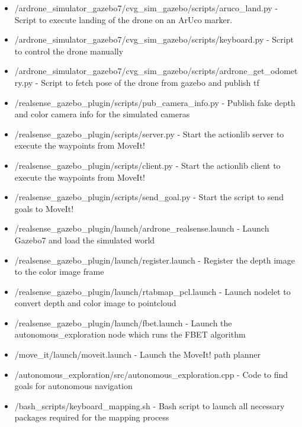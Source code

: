 \documentclass[a4paper,12pt,oneside]{book}
\begin{document}
\begin{itemize}

	\item /ardrone\_simulator\_gazebo7/cvg\_sim\_gazebo/scripts/aruco\_land.py - Script to execute landing of the drone on an ArUco marker.

	\item /ardrone\_simulator\_gazebo7/cvg\_sim\_gazebo/scripts/keyboard.py - Script to control the drone manually
	
	\item /ardrone\_simulator\_gazebo7/cvg\_sim\_gazebo/scripts/ardrone\_get\_odometry.py - Script to fetch pose of the drone from gazebo and publish tf
	
	\item /realsense\_gazebo\_plugin/scripts/pub\_camera\_info.py - Publish fake depth and color camera info for the simulated cameras
	
	\item /realsense\_gazebo\_plugin/scripts/server.py - Start the actionlib server to execute the waypoints from MoveIt!
	
	\item /realsense\_gazebo\_plugin/scripts/client.py - Start the actionlib client to execute the waypoints from MoveIt!
	
	\item /realsense\_gazebo\_plugin/scripts/send\_goal.py - Start the script to send goals to MoveIt!
	
	\item /realsense\_gazebo\_plugin/launch/ardrone\_realsense.launch - Launch Gazebo7 and load the simulated world
	
	\item /realsense\_gazebo\_plugin/launch/register.launch - Register the depth image to the color image frame
	
	\item /realsense\_gazebo\_plugin/launch/rtabmap\_pcl.launch - Launch nodelet to convert depth and color image to pointcloud
	
	\item /realsense\_gazebo\_plugin/launch/fbet.launch - Launch the autonomous\_exploration node which runs the FBET algorithm
	
	\item /move\_it/launch/moveit.launch - Launch the MoveIt! path planner
	
	\item /autonomous\_exploration/src/autonomous\_exploration.cpp - Code to find goals for autonomous navigation	
	
	\item /bash\_scripts/keyboard\_mapping.sh - Bash script to launch all necessary packages required for the mapping process
	
\end{itemize}
\end{document}
